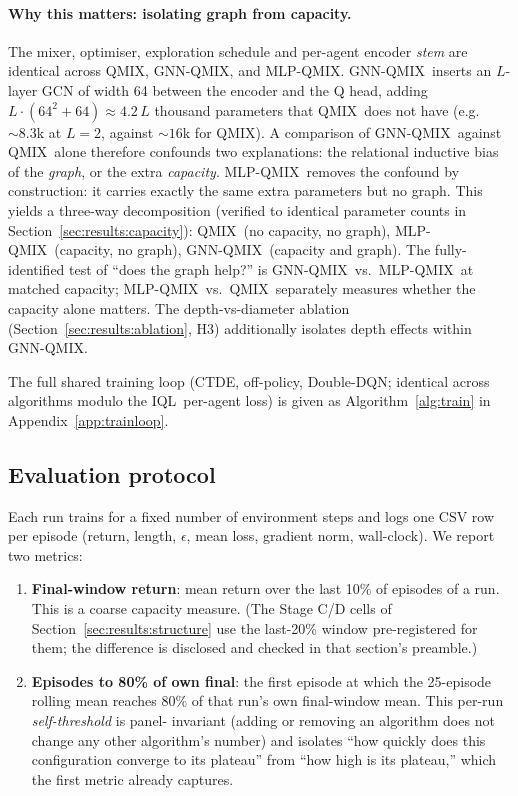 \documentclass[10pt]{article}
\newcommand{\algoname}[1]{\textsc{#1}}
\newcommand{\iql}{\algoname{IQL}}
\newcommand{\qmix}{\algoname{QMIX}}
\newcommand{\gnnqmix}{\algoname{GNN-QMIX}}
\newcommand{\mlpqmix}{\algoname{MLP-QMIX}}
\begin{document}
\paragraph{Why this matters: isolating graph from capacity.} The mixer,
optimiser, exploration schedule and per-agent encoder \emph{stem} are
identical across \qmix, \gnnqmix, and \mlpqmix. \gnnqmix\ inserts an
$L$-layer GCN of width 64 between the encoder and the Q head, adding
$L \cdot (64^2 + 64) \approx 4.2\,L$ thousand parameters that \qmix\ does
not have (e.g.\ $\sim 8.3$k at $L=2$, against $\sim 16$k for \qmix). A
comparison of \gnnqmix\ against \qmix\ alone therefore confounds two
explanations: the relational inductive bias of the \emph{graph}, or the
extra \emph{capacity}. \mlpqmix\ removes the confound by construction: it
carries exactly the same extra parameters but no graph. This yields a
three-way decomposition (verified to identical parameter counts in
Section~\ref{sec:results:capacity}): \qmix\ (no capacity, no graph),
\mlpqmix\ (capacity, no graph), \gnnqmix\ (capacity and graph). The
fully-identified test of ``does the graph help?'' is \gnnqmix\ vs.\
\mlpqmix\ at matched capacity; \mlpqmix\ vs.\ \qmix\ separately measures
whether the capacity alone matters. The depth-vs-diameter ablation
(Section~\ref{sec:results:ablation}, H3) additionally isolates depth
effects within \gnnqmix.

The full shared training loop (CTDE, off-policy, Double-DQN; identical
across algorithms modulo the \iql\ per-agent loss) is given as
Algorithm~\ref{alg:train} in Appendix~\ref{app:trainloop}.

\subsection{Evaluation protocol}
\label{sec:protocol}

Each run trains for a fixed number of environment steps and logs one CSV
row per episode (return, length, $\epsilon$, mean loss, gradient norm,
wall-clock). We report two metrics:

\begin{enumerate}[leftmargin=*,itemsep=0pt,topsep=2pt]
  \item \textbf{Final-window return}: mean return over the last 10\% of
        episodes of a run. This is a coarse capacity measure. (The Stage
        C/D cells of Section~\ref{sec:results:structure} use the last-20\%
        window pre-registered for them; the difference is disclosed and
        checked in that section's preamble.)
  \item \textbf{Episodes to 80\% of own final}: the first episode at
        which the 25-episode rolling mean reaches 80\% of that run's own
        final-window mean. This per-run \emph{self-threshold} is panel-
        invariant (adding or removing an algorithm does not change any
        other algorithm's number) and isolates ``how quickly does this
        configuration converge to its plateau'' from ``how high is its
        plateau,'' which the first metric already captures.
\end{enumerate}
\end{document}
